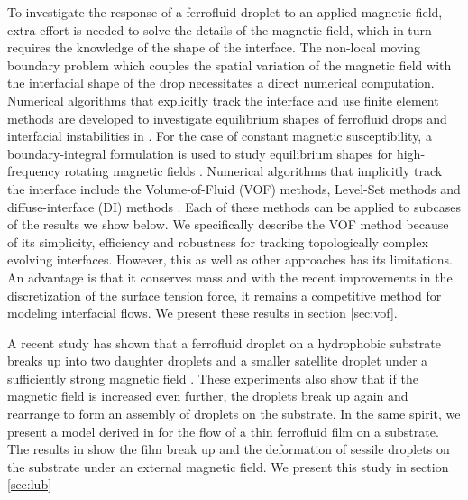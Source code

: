 To investigate the response of a ferrofluid droplet to an applied
magnetic field, extra effort is needed to solve the details of the 
magnetic field, which in turn requires the knowledge of the
shape of the interface. The non-local moving boundary problem
which couples the spatial variation of the magnetic field with the 
interfacial shape of the drop necessitates a direct numerical computation. 
Numerical algorithms that explicitly track the interface and use finite
element methods are developed to investigate equilibrium shapes of
ferrofluid drops and interfacial instabilities in \cite{Lavrova,Lavrova04,Bashtovoi,Matthies,Knieling}. 
For the case of constant magnetic susceptibility, a boundary-integral 
formulation is used to study equilibrium shapes for high-frequency 
rotating magnetic fields \cite{Erdmanis2017}.  Numerical algorithms that 
implicitly track the interface include the Volume-of-Fluid (VOF) methods, 
Level-Set methods and diffuse-interface (DI) methods \cite{Scar99,Sethian2003,AMW}. 
Each of these methods can be applied to subcases of the results we show below. 
We specifically describe the VOF method because of its simplicity, efficiency and 
robustness for tracking topologically complex evolving interfaces. 
However, this as well as other approaches has its limitations. 
An advantage is that it conserves mass and with the recent improvements 
in the discretization of the surface tension force, it remains a competitive 
method for modeling interfacial flows. We present these results in section \ref{sec:vof}.

A recent study has shown that a ferrofluid droplet on a hydrophobic substrate 
breaks up into two daughter droplets and a smaller satellite droplet under a sufficiently
strong magnetic field \cite{Timonen2013}. These experiments also show that if the magnetic
field is increased even further, the droplets break up again and rearrange to form an assembly
of droplets on the substrate. In the same spirit, we present a model derived in \cite{Seric2014}
for the flow of a thin ferrofluid film on a substrate. The results in  \cite{Seric2014} show 
the film break up and the deformation of sessile droplets on the substrate under an external magnetic field.
We present this study in section \ref{sec:lub} 

